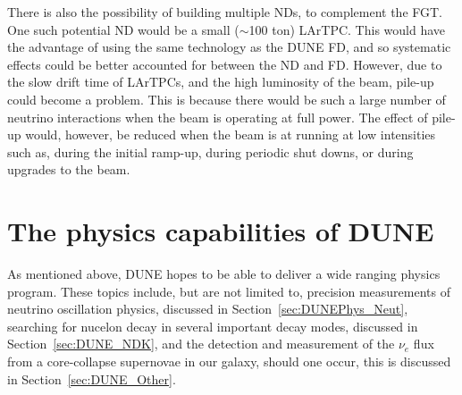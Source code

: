 There is also the possibility of building multiple NDs, to complement the FGT. One such potential ND would be a small ($\sim$100 ton) LArTPC. This would have the advantage of using the same technology as the DUNE FD, and so systematic effects could be better accounted for between the ND and FD. However, due to the slow drift time of LArTPCs, and the high luminosity of the beam, pile-up could become a problem. This is because there would be such a large number of neutrino interactions when the beam is operating at full power. The effect of pile-up would, however, be reduced when the beam is at running at low intensities such as, during the initial ramp-up, during periodic shut downs, or during upgrades to the beam. \\

\section{The physics capabilities of DUNE} \label{sec:DUNEPhys}%
As mentioned above, DUNE hopes to be able to deliver a wide ranging physics program. These topics include, but are not limited to, precision measurements of neutrino oscillation physics, discussed in Section~\ref{sec:DUNEPhys_Neut}, searching for nucelon decay in several important decay modes, discussed in Section~\ref{sec:DUNE_NDK}, and the detection and measurement of the $\nu_e$ flux from a core-collapse supernovae in our galaxy, should one occur, this is discussed in Section~\ref{sec:DUNE_Other}. \\

